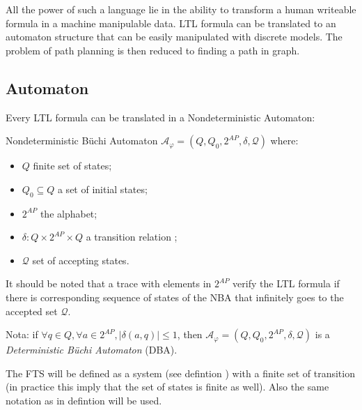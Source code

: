 All the power of such a language lie in the ability to transform a human writeable formula in a machine manipulable data. LTL formula can be translated to an automaton structure that can be easily manipulated with discrete models. The problem of path planning is then reduced to finding a path in graph.

\subsection{Automaton}
Every LTL formula can be translated in a Nondeterministic \buchi{} Automaton:
\begin{nameddef}{Nondeterministic B\"{u}chi Automaton}
$\mathcal{A}_{\varphi} = (Q, Q_0, 2^{AP}, \delta, \mathcal{Q})$
where:
\begin{itemize}[noitemsep,nolistsep,topsep=0pt,after=\relax]
\item $Q$ finite set of states;
\item $Q_0 \subseteq Q$ a set of initial states;
\item $2^{AP}$ the alphabet;
\item $\delta: Q \times 2^{AP} \times Q$ a transition relation ;
\item $\mathcal{Q}$ set of accepting states.\popQED
\end{itemize}
\end{nameddef}
It should be noted that a trace with elements in $2^{AP}$ verify the LTL formula if there is corresponding sequence of states of the NBA that infinitely goes to the accepted set $\mathcal{Q}$.

Nota: if $\forall q \in Q, \forall a \in 2^{AP}, | \delta(a,q) | \leq 1$, then $\mathcal{A}_{\varphi} = (Q, Q_0, 2^{AP}, \delta, \mathcal{Q})$ is a \textit{Deterministic B\"uchi Automaton} (DBA).

The FTS will be defined as a system (see defintion \label{def:system}) with a finite set of transition (in practice this imply that the set of states is finite as well). Also the same notation as in defintion \label{def:system} will be used.

